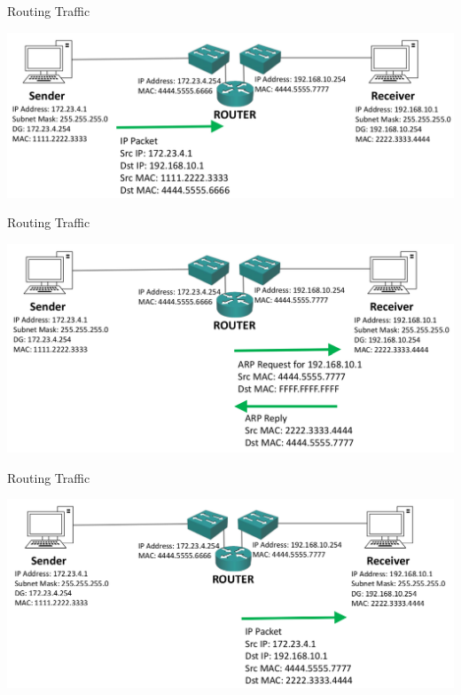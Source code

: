 \documentclass[pdflatex,compress,mathserif]{beamer}
\begin{document}
\begin{frame}{Routing Traffic}
	\begin{center}
		\includegraphics[width=\linewidth]{img/img11}
	\end{center}
\end{frame}

\begin{frame}{Routing Traffic}
	\begin{center}
		\includegraphics[width=\linewidth]{img/img12}
	\end{center}
\end{frame}

\begin{frame}{Routing Traffic}
	\begin{center}
		\includegraphics[width=\linewidth]{img/img13}
	\end{center}
\end{frame}
\end{document}
